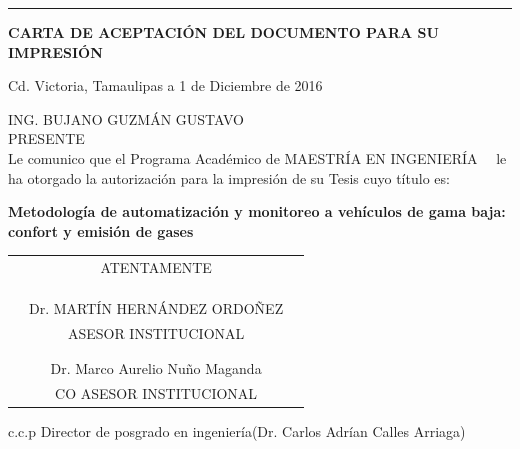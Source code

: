 \documentclass[12pt]{article}
\newcommand{\HRule}{\rule{\linewidth}{0.25mm}}
\newcommand{\nproyecto}           {Metodología de automatización y monitoreo a vehículos de gama baja: confort y emisión de gases}
\newcommand{\nalumno}             {ING. BUJANO GUZMÁN GUSTAVO}
\newcommand{\ncarrera}            {MAESTRÍA EN INGENIERÍA }
\newcommand{\nasesorinstitucional}{Dr. MARTÍN HERNÁNDEZ ORDOÑEZ}
\newcommand{\nasesorinstitucionaldos}{Dr. Marco Aurelio Nuño Maganda}
\newcommand{\fechacarta}{1 de Diciembre de 2016}
\newcommand{\separacionCorta}{0.0cm}
\newcommand{\separacionLarga}{0.5cm}
\begin{document}
\HRule 


\clearpage
\thispagestyle{fancy}
\setcounter{page}{1}


\vspace*{1.5cm}
\large

\begin{center}
\textbf{CARTA DE ACEPTACIÓN DEL DOCUMENTO PARA SU IMPRESIÓN}\\[\separacionLarga]
\end{center}

\begin{flushright}
Cd. Victoria, Tamaulipas a \fechacarta \\[\separacionLarga]
\end{flushright}

\parindent=0mm

\nalumno \\
PRESENTE \\[\separacionCorta]

Le comunico que  el Programa Académico de \ncarrera\ \ le ha otorgado la autorización para la impresión de su Tesis cuyo título es: \\[\separacionCorta]

\begin{center}
\textbf{\nproyecto} \\[\separacionLarga]
\end{center}


\begin{center}	
\begin{tabular}{ccc}
\centering

& ATENTAMENTE & \\ 
& & \\
& & \\
& & \\ \hline
& \nasesorinstitucional & \\
& ASESOR INSTITUCIONAL & \\
\textbf{} \\[\separacionLarga]

& & \\ \hline
& \nasesorinstitucionaldos & \\
& CO ASESOR INSTITUCIONAL & \\


\end{tabular}
\end{center} 
\vspace{2cm}
c.c.p Director de posgrado en ingeniería(Dr. Carlos Adrían Calles Arriaga)
\end{document}
